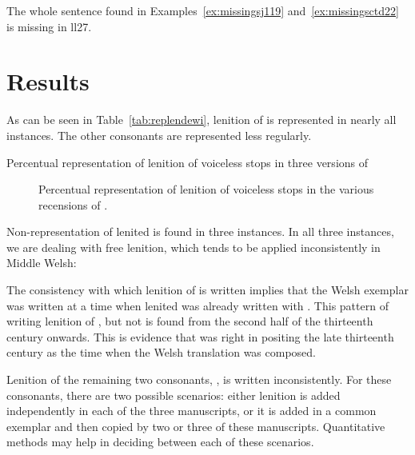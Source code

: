 \begin{mwl}
\end{mwl}

The whole sentence found in Examples~\ref{ex:missingsj119} and~\ref{ex:missingsctd22} is missing in \gls{ll27}.

\section{Results}
\label{sec:results-1}
As can be seen in Table~\ref{tab:replendewi}, lenition of  is represented in nearly all instances. The other consonants are represented less regularly.
\begin{table}[h]
  \centering
  
  \caption{Percentual representation of lenition of voiceless stops in three versions of }
  \label{tab:replendewi}
\end{table} 

\begin{figure}[h]
  \centering
  
  \caption{Percentual representation of lenition of voiceless stops in the various recensions of .}
  \label{fig:barchartdewi}
\end{figure}


Non-representation of lenited  is found in three instances. In all three instances, we are dealing with free lenition, which tends to be applied inconsistently in Middle Welsh:


The consistency with which lenition of  is written implies that the Welsh exemplar was written at a time when lenited  was already written with . This pattern of writing lenition of , but not  is found from the second half of the thirteenth century onwards. This is evidence that \textcite{Rob_Ystoriaeu11} was right in positing the late thirteenth century as the time when the Welsh translation was composed.

Lenition of the remaining two consonants, , is written inconsistently. For these consonants, there are two possible scenarios: either lenition is added independently in each of the three manuscripts, or it is added in a common exemplar and then copied by two or three of these manuscripts. Quantitative methods may help in deciding between each of these scenarios.


